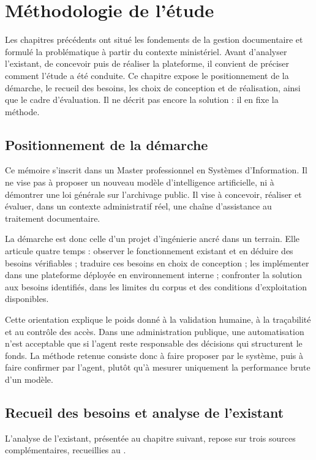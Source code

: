 \chapter{Méthodologie de l'étude}
\label{ch:methodologie}

Les chapitres précédents ont situé les fondements de la gestion documentaire et formulé la problématique à partir du contexte ministériel. Avant d'analyser l'existant, de concevoir puis de réaliser la plateforme, il convient de préciser comment l'étude a été conduite. Ce chapitre expose le positionnement de la démarche, le recueil des besoins, les choix de conception et de réalisation, ainsi que le cadre d'évaluation. Il ne décrit pas encore la solution : il en fixe la méthode.

\section{Positionnement de la démarche}

Ce mémoire s'inscrit dans un Master professionnel en Systèmes d'Information. Il ne vise pas à proposer un nouveau modèle d'intelligence artificielle, ni à démontrer une loi générale sur l'archivage public. Il vise à concevoir, réaliser et évaluer, dans un contexte administratif réel, une chaîne d'assistance au traitement documentaire.

La démarche est donc celle d'un projet d'ingénierie ancré dans un terrain. Elle articule quatre temps : observer le fonctionnement existant et en déduire des besoins vérifiables ; traduire ces besoins en choix de conception ; les implémenter dans une plateforme déployée en environnement interne ; confronter la solution aux besoins identifiés, dans les limites du corpus et des conditions d'exploitation disponibles.

Cette orientation explique le poids donné à la validation humaine, à la traçabilité et au contrôle des accès. Dans une administration publique, une automatisation n'est acceptable que si l'agent reste responsable des décisions qui structurent le fonds. La méthode retenue consiste donc à faire proposer par le système, puis à faire confirmer par l'agent, plutôt qu'à mesurer uniquement la performance brute d'un modèle.

\section{Recueil des besoins et analyse de l'existant}

L'analyse de l'existant, présentée au chapitre suivant, repose sur trois sources complémentaires, recueillies au \nomMinistere{}.

